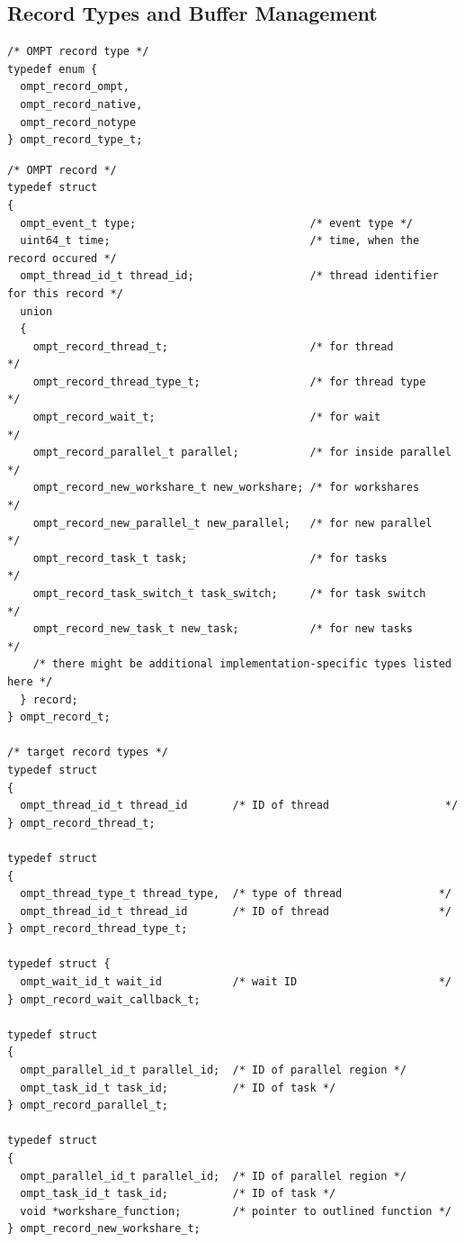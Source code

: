 \documentclass{article}
\begin{document}
{\clearpage  
\subsection{Record Types and Buffer Management}
\label{appendix:ompt-records}

\begin{verbatim}
/* OMPT record type */
typedef enum {
  ompt_record_ompt,
  ompt_record_native,
  ompt_record_notype
} ompt_record_type_t; 
\end{verbatim}

\begin{verbatim}
/* OMPT record */
typedef struct
{
  ompt_event_t type;                           /* event type */
  uint64_t time;                               /* time, when the record occured */
  ompt_thread_id_t thread_id;                  /* thread identifier for this record */
  union
  {
    ompt_record_thread_t;                      /* for thread          */
    ompt_record_thread_type_t;                 /* for thread type     */
    ompt_record_wait_t;                        /* for wait            */
    ompt_record_parallel_t parallel;           /* for inside parallel */
    ompt_record_new_workshare_t new_workshare; /* for workshares      */
    ompt_record_new_parallel_t new_parallel;   /* for new parallel    */
    ompt_record_task_t task;                   /* for tasks           */
    ompt_record_task_switch_t task_switch;     /* for task switch     */
    ompt_record_new_task_t new_task;           /* for new tasks       */
    /* there might be additional implementation-specific types listed here */
  } record;
} ompt_record_t;

/* target record types */
typedef struct
{
  ompt_thread_id_t thread_id       /* ID of thread                  */
} ompt_record_thread_t;

typedef struct
{
  ompt_thread_type_t thread_type,  /* type of thread               */
  ompt_thread_id_t thread_id       /* ID of thread                 */
} ompt_record_thread_type_t;

typedef struct {
  ompt_wait_id_t wait_id           /* wait ID                      */
} ompt_record_wait_callback_t;

typedef struct
{
  ompt_parallel_id_t parallel_id;  /* ID of parallel region */
  ompt_task_id_t task_id;          /* ID of task */
} ompt_record_parallel_t;

typedef struct
{
  ompt_parallel_id_t parallel_id;  /* ID of parallel region */
  ompt_task_id_t task_id;          /* ID of task */
  void *workshare_function;        /* pointer to outlined function */
} ompt_record_new_workshare_t;


\end{verbatim}}
\end{document}
